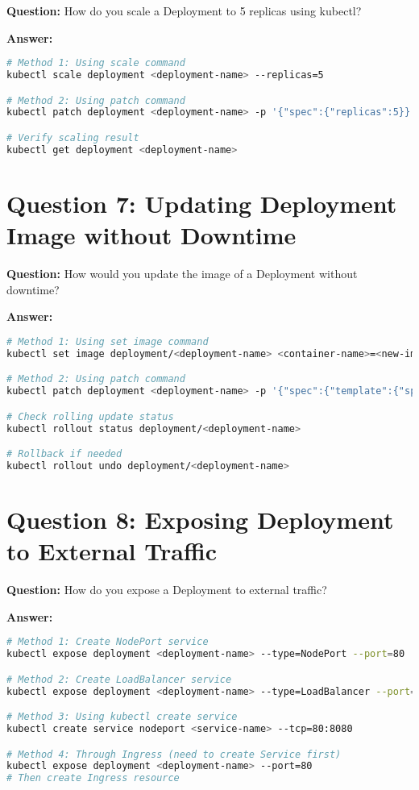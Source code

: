 \documentclass[12pt,a4paper]{article}
\begin{document}
\textbf{Question:} How do you scale a Deployment to 5 replicas using kubectl?

\textbf{Answer:}
\begin{lstlisting}[language=bash]
# Method 1: Using scale command
kubectl scale deployment <deployment-name> --replicas=5

# Method 2: Using patch command
kubectl patch deployment <deployment-name> -p '{"spec":{"replicas":5}}'

# Verify scaling result
kubectl get deployment <deployment-name>
\end{lstlisting}

\section{Question 7: Updating Deployment Image without Downtime}

\textbf{Question:} How would you update the image of a Deployment without downtime?

\textbf{Answer:}
\begin{lstlisting}[language=bash]
# Method 1: Using set image command
kubectl set image deployment/<deployment-name> <container-name>=<new-image>

# Method 2: Using patch command
kubectl patch deployment <deployment-name> -p '{"spec":{"template":{"spec":{"containers":[{"name":"<container-name>","image":"<new-image>"}]}}}}'

# Check rolling update status
kubectl rollout status deployment/<deployment-name>

# Rollback if needed
kubectl rollout undo deployment/<deployment-name>
\end{lstlisting}

\section{Question 8: Exposing Deployment to External Traffic}

\textbf{Question:} How do you expose a Deployment to external traffic?

\textbf{Answer:}
\begin{lstlisting}[language=bash]
# Method 1: Create NodePort service
kubectl expose deployment <deployment-name> --type=NodePort --port=80

# Method 2: Create LoadBalancer service
kubectl expose deployment <deployment-name> --type=LoadBalancer --port=80

# Method 3: Using kubectl create service
kubectl create service nodeport <service-name> --tcp=80:8080

# Method 4: Through Ingress (need to create Service first)
kubectl expose deployment <deployment-name> --port=80
# Then create Ingress resource
\end{lstlisting}
\end{document}
